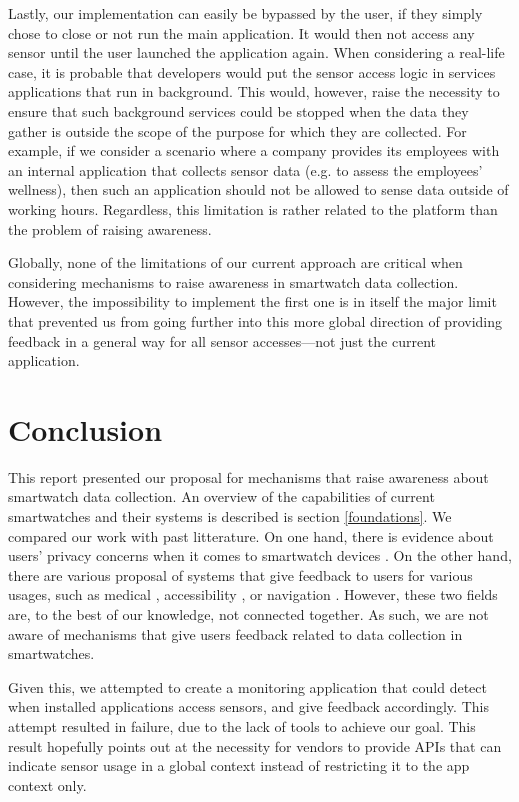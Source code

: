 \documentclass[conference, a4paper, 10pt, twocolumn]{IEEEtran}
\begin{document}
Lastly, our implementation can easily be bypassed by the user, if they simply chose to close or not run the main application. It would then not access any sensor until the user launched the application again. When considering a real-life case, it is probable that developers would put the sensor access logic in services applications that run in background. This would, however, raise the necessity to ensure that such background services could be stopped when the data they gather is outside the scope of the purpose for which they are collected. For example, if we consider a scenario where a company provides its employees with an internal application that collects sensor data (e.g. to assess the employees' wellness), then such an application should not be allowed to sense data outside of working hours. Regardless, this limitation is rather related to the platform than the problem of raising awareness. 

Globally, none of the limitations of our current approach are critical when considering mechanisms to raise awareness in smartwatch data collection. However, the impossibility to implement the first one is in itself the major limit that prevented us from going further into this more global direction of providing feedback in a general way for all sensor accesses---not just the current application.

\section{Conclusion}
This report presented our proposal for mechanisms that raise awareness about smartwatch data collection. An overview of the capabilities of current smartwatches and their systems is described is section \ref{foundations}. We compared our work with past litterature. On one hand, there is evidence about users' privacy concerns when it comes to smartwatch devices \cite{udoh2016privacy,datta2018survey,motti2015users}. On the other hand, there are various proposal of systems that give feedback to users for various usages, such as medical \cite{lee2019smartwatch}, accessibility \cite{goodman2020evaluating}, or navigation \cite{dobbelstein2016unconstrained}. However, these two fields are, to the best of our knowledge, not connected together. As such, we are not aware of mechanisms that give users feedback related to data collection in smartwatches. 

Given this, we attempted to create a monitoring application that could detect when installed applications access sensors, and give feedback accordingly. This attempt resulted in failure, due to the lack of tools to achieve our goal. This result hopefully points out at the necessity for vendors to provide \acp{API} that can indicate sensor usage in a global context instead of restricting it to the app context only. 
\end{document}
